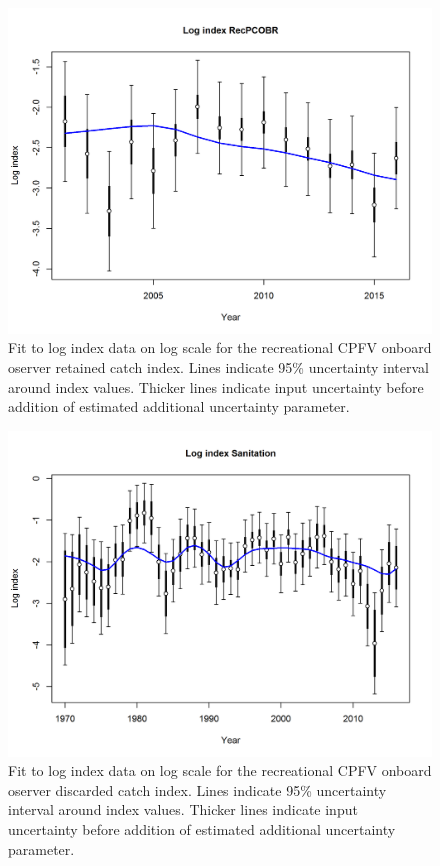 \documentclass[12pt,]{article}
\begin{document}
\begin{figure}[htbp]
\centering
\includegraphics{r4ss/plots_mod1/index5_logcpuefit_RecPCOBR.png}
\caption{Fit to log index data on log scale for the recreational CPFV
onboard oserver retained catch index. Lines indicate 95\% uncertainty
interval around index values. Thicker lines indicate input uncertainty
before addition of estimated additional uncertainty parameter.
\label{fig:RecPCOBR_indexfit}}
\end{figure}

\FloatBarrier

\begin{figure}[htbp]
\centering
\includegraphics{r4ss/plots_mod1/index5_logcpuefit_Sanitation.png}
\caption{Fit to log index data on log scale for the recreational CPFV
onboard oserver discarded catch index. Lines indicate 95\% uncertainty
interval around index values. Thicker lines indicate input uncertainty
before addition of estimated additional uncertainty parameter.
\label{fig:Sanitation_indexfit}}
\end{figure}
\end{document}
